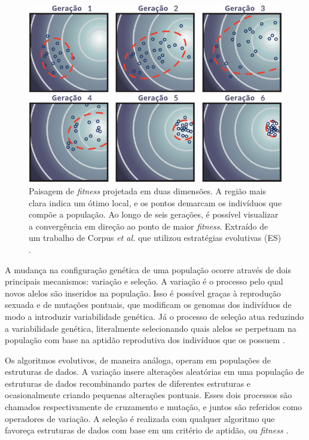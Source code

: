 \documentclass[
	12pt,				%
	openright,			%
	twoside,			%
	a4paper,			%
	tcc,			%
	]{ABNT-DC-UEL}
\begin{document}
\begin{figure}[htb]
    \centering
    \includegraphics{convergencia}
    \caption{Paisagem de \textit{fitness} projetada em duas dimensões. A região mais clara indica um ótimo local, e os pontos demarcam os indivíduos que compõe a população. Ao longo de seis gerações, é possível visualizar a convergência em direção ao ponto de maior \textit{fitness}. Extraído de um trabalho de Corpus \textit{et al.} que utilizou estratégias evolutivas (ES) \cite{corpus:23}.}
    \label{fig:convergencia}
\end{figure}

A mudança na configuração genética de uma população ocorre através de dois principais mecanismos: variação e seleção. A variação é o processo pelo qual novos alelos são inseridos na população. Isso é possível graças à reprodução sexuada e de mutações pontuais, que modificam os genomas dos indivíduos de modo a introduzir variabilidade genética. Já o processo de seleção atua reduzindo a variabilidade genética, literalmente selecionando quais alelos se perpetuam na população com base na aptidão reprodutiva dos indivíduos que os possuem \cite{ashlock:06}.

Os algoritmos evolutivos, de maneira análoga, operam em populações de estruturas de dados. A variação insere alterações aleatórias em uma população de estruturas de dados recombinando partes de diferentes estruturas e ocasionalmente criando pequenas alterações pontuais. Esses dois processos são chamados respectivamente de cruzamento e mutação, e juntos são referidos como operadores de variação. A seleção é realizada com qualquer algoritmo que favoreça estruturas de dados com base em um critério de aptidão, ou \textit{fitness} \cite{ashlock:06, eiben:15}.
\end{document}
